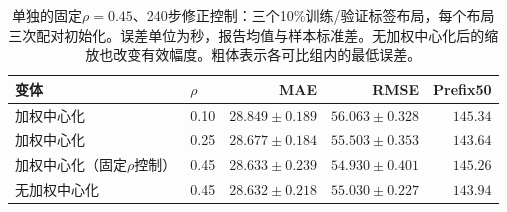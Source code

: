 \begin{table}[t]
\centering\footnotesize\setlength{\tabcolsep}{4pt}
\caption{单独的固定$\rho=0.45$、240步修正控制：三个10\%训练/验证标签布局，每个布局三次配对初始化。误差单位为秒，报告均值与样本标准差。无加权中心化后的缩放也改变有效幅度。粗体表示各可比组内的最低误差。}\label{tab:redistribution}
\begin{tabular}{llrrr}\toprule
变体 & $\rho$ & MAE & RMSE & Prefix50\\\midrule
加权中心化 & 0.10 & $28.849\pm0.189$ & $56.063\pm0.328$ & $145.34$\\
加权中心化 & 0.25 & $28.677\pm0.184$ & $55.503\pm0.353$ & $\mathbf{143.64}$\\
加权中心化（固定$\rho$控制） & 0.45 & $28.633\pm0.239$ & $\mathbf{54.930\pm0.401}$ & $145.26$\\
无加权中心化 & 0.45 & $\mathbf{28.632\pm0.218}$ & $55.030\pm0.227$ & $143.94$\\
\bottomrule\end{tabular}
\end{table}
